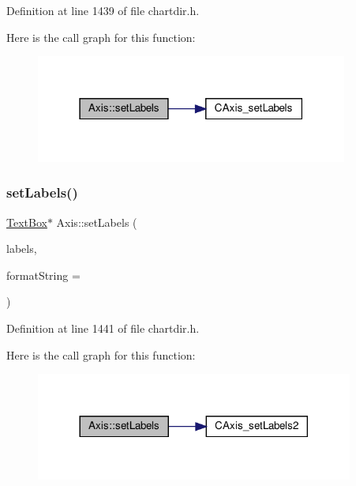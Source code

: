 Definition at line 1439 of file chartdir.\+h.

Here is the call graph for this function\+:
\nopagebreak
\begin{figure}[H]
\begin{center}
\leavevmode
\includegraphics[width=291pt]{class_axis_a6259ea2b433580896ac821ff442e8efe_cgraph}
\end{center}
\end{figure}
\mbox{\label{class_axis_a4e7ea5b86e98eabc102851790543d119}} 
\subsubsection{\texorpdfstring{set\+Labels()}{setLabels()}\hspace{0.1cm}{\footnotesize\ttfamily [3/3]}}
{\footnotesize\ttfamily \hyperlink{class_text_box}{Text\+Box}$\ast$ Axis\+::set\+Labels (\begin{DoxyParamCaption}\item[{\hyperlink{class_double_array}{Double\+Array}}]{labels,  }\item[{const char $\ast$}]{format\+String = {} }\end{DoxyParamCaption})\hspace{0.3cm}{\ttfamily [inline]}}



Definition at line 1441 of file chartdir.\+h.

Here is the call graph for this function\+:
\nopagebreak
\begin{figure}[H]
\begin{center}
\leavevmode
\includegraphics[width=296pt]{class_axis_a4e7ea5b86e98eabc102851790543d119_cgraph}
\end{center}
\end{figure}
\mbox{\label{class_axis_a111155ffdce1d11e8896e5f185a7b753}} 
